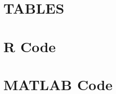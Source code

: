 \documentclass{CPP}
\begin{document}
\AddAppendix

\appendix

\chapter{TABLES}\label{appendix:salmon}



\chapter{R Code}\label{appendix:RCode}



\chapter{MATLAB Code}\label{appendix:MatlabCode}





\end{document}

